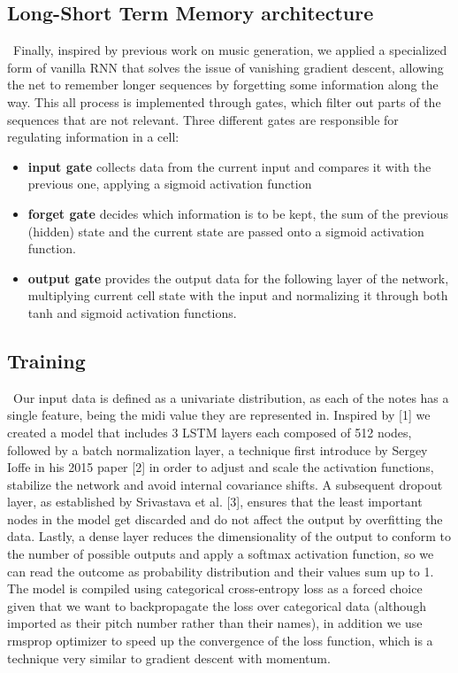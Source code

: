 \documentclass[12pt]{article}
\begin{document}
\subsection*{Long-Short Term Memory architecture}
\begin{flushright}
  \begin{minipage}[t]{0.96\linewidth}\
    Finally, inspired by previous work on music generation, we applied a specialized form of vanilla RNN that solves the issue of vanishing gradient descent, allowing the net to remember longer sequences by forgetting some information along the way. This all process is implemented through gates, which filter out parts of the sequences that are not relevant. Three different gates are responsible for regulating information in a cell:
    \begin{itemize}
      \item \textbf{input gate} collects data from the current input and compares it with the previous one, applying a sigmoid activation function
      \item \textbf{forget gate} decides which information is to be kept, the sum of the previous (hidden) state and the current state are passed onto a sigmoid activation function.
      \item \textbf{output gate} provides the output data for the following layer of the network, multiplying current cell state with the input and normalizing it through both tanh and sigmoid activation functions.
    \end{itemize}
  \end{minipage}
\end{flushright}
\subsection*{Training}
\begin{flushright}
  \begin{minipage}[t]{0.96\linewidth}\
    Our input data is defined as a univariate distribution, as each of the notes has a single feature, being the midi value they are represented in. Inspired by [1] we created a model that includes 3 LSTM layers each composed of 512 nodes, followed by a batch normalization layer, a technique first introduce by Sergey Ioffe in his 2015 paper [2] in order to adjust and scale the activation functions, stabilize the network and avoid internal covariance shifts. A subsequent dropout layer, as established by Srivastava et al. [3], ensures that the least important nodes in the model get discarded and do not affect the output by overfitting the data. Lastly, a dense layer reduces the dimensionality of the output to conform to the number of possible outputs and apply a softmax activation function, so we can read the outcome as probability distribution and their values sum up to 1. The model is compiled using categorical cross-entropy loss as a forced choice given that we want to backpropagate the loss over categorical data (although imported as their pitch number rather than their names), in addition we use rmsprop optimizer to speed up the convergence of the loss function, which is a technique very similar to gradient descent with momentum.
  \end{minipage}
\end{flushright}
\end{document}
